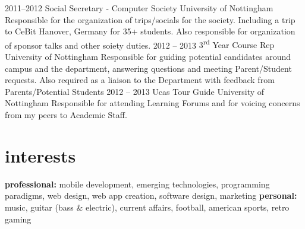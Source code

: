 \documentclass[]{friggeri-cv} %
\begin{document}
\begin{entrylist}
\entry
{2011--2012}
{Social Secretary - Computer Society}
{University of Nottingham}
{Responsible for the organization of trips/socials for the society.
Including a trip to CeBit Hanover, Germany for 35+ students. Also responsible for organization of sponsor talks and other soiety duties.}
\entry
{2012 -- 2013}
{3\textsuperscript{rd} Year Course Rep}
{University of Nottingham}
{Responsible for guiding potential candidates around campus and the department, answering questions and meeting Parent/Student requests. Also required as a liaison to the Department with feedback from Parents/Potential Students}
\entry
{2012 -- 2013}
{Ucas Tour Guide}
{University of Nottingham}
{Responsible for attending Learning Forums and for voicing concerns from my peers to Academic Staff.}
\end{entrylist}


\section{interests}

\textbf{professional:} mobile development, emerging technologies, programming paradigms, web design, web app creation, software design, marketing \textbf{personal:} music, guitar (bass \& electric), current affairs, football, american sports, retro gaming




\end{document}
